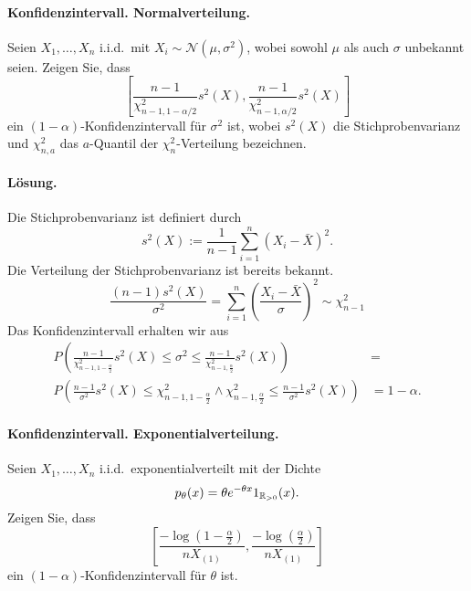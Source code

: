 \paragraph{Konfidenzintervall. Normalverteilung. } Seien $X_1,\ldots,X_n$ i.i.d.\ mit 
$X_i\sim \mathcal N(\mu,\sigma^2)$, wobei sowohl $\mu$ als auch $\sigma$ unbekannt seien.
Zeigen Sie, dass
\begin{equation*}
    \left[ \frac{n-1}{\chi^2_{n-1,1-\alpha/2}}s^2(X), \frac{n-1}{\chi^2_{n-1,\alpha/2}}s^2(X) \right]
\end{equation*}
ein $\left( 1-\alpha \right)$-Konfidenzintervall für $\sigma^2$ ist, wobei
$s^2(X)$ die Stichprobenvarianz und $\chi^2_{n,a}$ das $a$-Quantil der $\chi^2_n$-Verteilung bezeichnen.

\paragraph*{Lösung.}
Die Stichprobenvarianz ist definiert durch
\begin{equation*}
    s^2(X) := \frac{1}{n-1} \sum_{i=1}^{n} (X_i - \bar X)^2.
\end{equation*}
Die Verteilung der Stichprobenvarianz ist bereits bekannt.
\begin{equation*}
    \frac{(n-1) s^2(X)}{\sigma^2} = \sum_{i=1}^{n} \left( \frac{ X_i -\bar X}{\sigma} \right)^2
    \sim \chi^2_{n-1}
\end{equation*}
Das Konfidenzintervall erhalten wir aus
\begin{align*}
    P \left( \frac{n-1}{\chi^2_{n-1,1-\frac{\alpha}{2}} } s^2(X) 
    \leq \sigma^2 \leq 
    \frac{n-1}{ \chi^2_{n-1,\frac{\alpha}{2}} } s^2(X)
    \right) &= \\
    P \left( \frac{n-1}{\sigma^2} s^{2}(X) \leq \chi^2_{n-1,1-\frac{\alpha}{2}} \wedge
    \chi^2_{n-1,\frac{\alpha}{2}} \leq \frac{n-1}{\sigma^2} s^2(X)
    \right) &= 1-\alpha.
\end{align*}








\paragraph{Konfidenzintervall. Exponentialverteilung.  }
Seien $X_1,\ldots,X_n$ i.i.d.\ exponentialverteilt mit der Dichte
\begin{equation*}
    p_\theta(x) = \theta e^{- \theta x} 1_{ \mathbb R_{>0} }(x).
\end{equation*}
Zeigen Sie, dass 
\begin{equation*}
    \left[  \frac{- \log \left( 1 - \frac{\alpha}{2} \right)}{n X_{(1)}}, 
    \frac{- \log \left( \frac{\alpha}{2} \right)}{n X_{(1)}} \right]
\end{equation*}
ein $(1-\alpha)$-Konfidenzintervall für $\theta$ ist.

